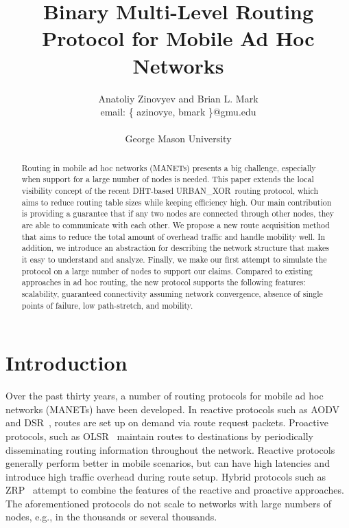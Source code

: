 \documentclass[conference]{IEEEtran}
\title{Binary Multi-Level Routing Protocol for Mobile Ad Hoc Networks}
\author{
  Anatoliy Zinovyev and Brian L. Mark \\
  email:   \{ azinovye, bmark \}@gmu.edu \\
   \\
  George Mason University \\
}
\theoremstyle{definition}
\newcommand{\urbanxor}{URBAN\_XOR}
\begin{document}
\maketitle

\begin{abstract}
Routing in mobile ad hoc networks (MANETs) presents a big challenge, especially when support for a large number of nodes is needed. This paper extends the local visibility concept of the recent DHT-based \urbanxor~routing protocol, which aims to reduce routing table sizes while keeping efficiency high. Our main contribution is providing a guarantee that if any two nodes are connected through other nodes, they are able to communicate with each other. We propose a new route acquisition method that aims to reduce the total amount of overhead traffic and handle mobility well. In addition, we introduce an abstraction for describing the network structure that makes it easy to understand and analyze. Finally, we make our first attempt to simulate the protocol on a large number of nodes to support our claims. Compared to existing approaches in ad hoc routing, the new protocol supports the following features:  scalability, guaranteed connectivity assuming network convergence, absence of single points of failure, low path-stretch, and mobility.
\end{abstract}



\section{Introduction}
\label{sec:introduction}

Over the past thirty years, a number of routing protocols for mobile ad hoc networks (MANETs) have been developed.
In reactive protocols such as AODV~\cite{aodv} and DSR~\cite{dsr}, routes are set up  on demand via route request packets.  Proactive protocols, such as OLSR~\cite{olsr} maintain routes to destinations by periodically disseminating routing information throughout the network. Reactive protocols generally perform better in mobile scenarios, but can have high latencies and introduce high traffic overhead during route setup.  Hybrid protocols such as ZRP~\cite{zrp} attempt to combine the features of the reactive and proactive approaches.  The aforementioned protocols do not scale to networks with large numbers of nodes, e.g., in the thousands or several thousands. 
  
\end{document}
